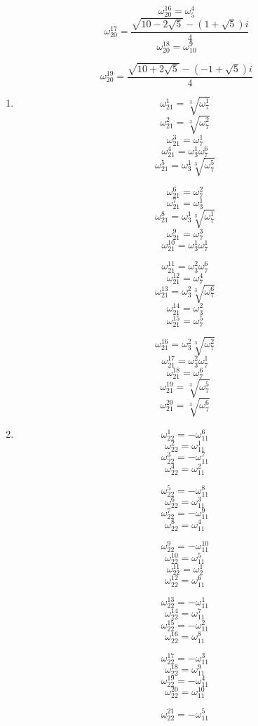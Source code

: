\documentclass{article}
\begin{document}
\[ \omega_{20}^{16}=\omega_{5}^{4} \]
\[ \omega_{20}^{17}=\frac{\sqrt{10-2\sqrt{5}}-(1+\sqrt{5})i}{4} \]
\[ \omega_{20}^{18}=\omega_{10}^{9} \]

\[ \omega_{20}^{19}=\frac{\sqrt{10+2\sqrt{5}}-(-1+\sqrt{5})i}{4} \]

\begin{enumerate}
\item \[ \omega_{21}^{1}=\sqrt[3]{\omega_{7}^{1}} \]
\[ \omega_{21}^{2}=\sqrt[3]{\omega_{7}^{2}} \]
\[ \omega_{21}^{3}=\omega_{7}^{1} \]
\[ \omega_{21}^{4}=\omega_{3}^{1}\omega_{7}^{6} \]
\[ \omega_{21}^{5}=\omega_{3}^{1}\sqrt[3]{\omega_{7}^{5}} \]

\[ \omega_{21}^{6}=\omega_{7}^{2} \]
\[ \omega_{21}^{7}=\omega_{3}^{1} \]
\[ \omega_{21}^{8}=\omega_{3}^{1}\sqrt[3]{\omega_{7}^{1}} \]
\[ \omega_{21}^{9}=\omega_{7}^{3} \]
\[ \omega_{21}^{10}=\omega_{3}^{1}\omega_{7}^{1} \]

\[ \omega_{21}^{11}=\omega_{3}^{2}\omega_{7}^{6} \]
\[ \omega_{21}^{12}=\omega_{7}^{4} \]
\[ \omega_{21}^{13}=\omega_{3}^{2}\sqrt[3]{\omega_{7}^{6}} \]
\[ \omega_{21}^{14}=\omega_{3}^{2} \]
\[ \omega_{21}^{15}=\omega_{7}^{5} \]

\[ \omega_{21}^{16}=\omega_{3}^{2}\sqrt[3]{\omega_{7}^{2}} \]
\[ \omega_{21}^{17}=\omega_{3}^{2}\omega_{7}^{1} \]
\[ \omega_{21}^{18}=\omega_{7}^{6} \]
\[ \omega_{21}^{19}=\sqrt[3]{\omega_{7}^{5}} \]
\[ \omega_{21}^{20}=\sqrt[3]{\omega_{7}^{6}} \]

\item \[ \omega_{22}^{1}=-\omega_{11}^{6} \]
\[ \omega_{22}^{2}=\omega_{11}^{1} \]
\[ \omega_{22}^{3}=-\omega_{11}^{7} \]
\[ \omega_{22}^{4}=\omega_{11}^{2} \]

\[ \omega_{22}^{5}=-\omega_{11}^{8} \]
\[ \omega_{22}^{6}=\omega_{11}^{3} \]
\[ \omega_{22}^{7}=-\omega_{11}^{9} \]
\[ \omega_{22}^{8}=\omega_{11}^{4} \]

\[ \omega_{22}^{9}=-\omega_{11}^{10} \]
\[ \omega_{22}^{10}=\omega_{11}^{5} \]
\[ \omega_{22}^{11}=\omega_{2}^{1} \]
\[ \omega_{22}^{12}=\omega_{11}^{6} \]

\[ \omega_{22}^{13}=-\omega_{11}^{1} \]
\[ \omega_{22}^{14}=\omega_{11}^{7} \]
\[ \omega_{22}^{15}=-\omega_{11}^{2} \]
\[ \omega_{22}^{16}=\omega_{11}^{8} \]

\[ \omega_{22}^{17}=-\omega_{11}^{3} \]
\[ \omega_{22}^{18}=\omega_{11}^{9} \]
\[ \omega_{22}^{19}=-\omega_{11}^{4} \]
\[ \omega_{22}^{20}=\omega_{11}^{10} \]

\[ \omega_{22}^{21}=-\omega_{11}^{5} \]


\end{enumerate}
\end{document}
